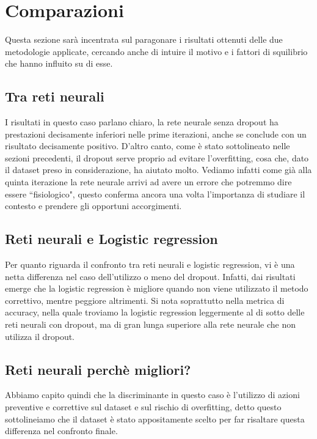 \section{Comparazioni}
Questa sezione sarà incentrata sul paragonare i risultati ottenuti delle due metodologie applicate, cercando anche di intuire il motivo e i fattori di squilibrio che hanno influito su di esse.
\subsection{Tra reti neurali}
I risultati in questo caso parlano chiaro, la rete neurale senza dropout ha prestazioni decisamente inferiori nelle prime iterazioni, anche se conclude con un risultato decisamente positivo. D'altro canto, come è stato sottolineato nelle sezioni precedenti, il dropout serve proprio ad evitare l'overfitting, cosa che, dato il dataset preso in considerazione, ha aiutato molto. Vediamo infatti come già alla quinta iterazione la rete neurale arrivi ad avere un errore che potremmo dire essere ``fisiologico", questo conferma ancora una volta l'importanza di studiare il contesto e prendere gli opportuni accorgimenti.
\subsection{Reti neurali e Logistic regression}
Per quanto riguarda il confronto tra reti neurali e logistic regression, vi è una netta differenza nel caso dell'utilizzo o meno del dropout. Infatti, dai risultati emerge che la logistic regression è migliore quando non viene utilizzato il metodo correttivo, mentre peggiore altrimenti. Si nota soprattutto nella metrica di accuracy, nella quale troviamo la logistic regression leggermente al di sotto delle reti neurali con dropout, ma di gran lunga superiore alla rete neurale che non utilizza il dropout.
\subsection{Reti neurali perchè migliori?}
Abbiamo capito quindi che la discriminante in questo caso è l'utilizzo di azioni preventive e correttive sul dataset e sul rischio di overfitting, detto questo sottolineiamo che il dataset è stato appositamente scelto per far risaltare questa differenza nel confronto finale.

